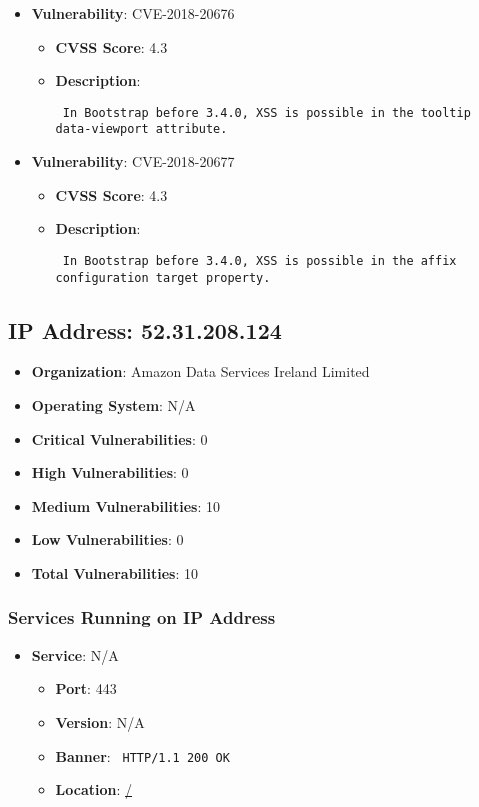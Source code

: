 \documentclass{article}
\begin{document}
\begin{itemize}
        \item \textbf{Vulnerability}: CVE-2018-20676
        \begin{itemize}
            \item \textbf{CVSS Score}:  4.3 
            \item \textbf{Description}: \parbox{\linewidth}{\texttt{ In Bootstrap before 3.4.0, XSS is possible in the tooltip data-viewport attribute. }}
        \end{itemize}
    
        \item \textbf{Vulnerability}: CVE-2018-20677
        \begin{itemize}
            \item \textbf{CVSS Score}:  4.3 
            \item \textbf{Description}: \parbox{\linewidth}{\texttt{ In Bootstrap before 3.4.0, XSS is possible in the affix configuration target property. }}
        \end{itemize}
    
\end{itemize}


\clearpage



\subsection*{IP Address: 52.31.208.124}

\begin{itemize}
    \item \textbf{Organization}: Amazon Data Services Ireland Limited
    \item \textbf{Operating System}:  N/A 
    \item \textbf{Critical Vulnerabilities}: 0
    \item \textbf{High Vulnerabilities}: 0
    \item \textbf{Medium Vulnerabilities}: 10
    \item \textbf{Low Vulnerabilities}: 0
    \item \textbf{Total Vulnerabilities}: 10
\end{itemize}

\subsubsection*{Services Running on IP Address}

\begin{itemize}
    
        \item \textbf{Service}: N/A
        \begin{itemize}
            \item \textbf{Port}: 443
            \item \textbf{Version}:  N/A 
            \item \textbf{Banner}: \texttt{ HTTP/1.1 200 OK
 }
            \item \textbf{Location}: \href{ / }{ / }
        \end{itemize}
    
\end{itemize}
\end{document}
